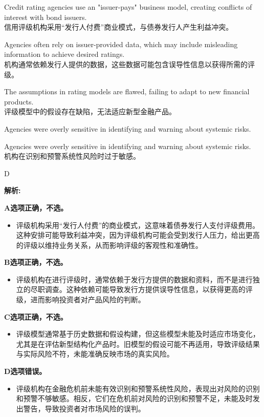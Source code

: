 \documentclass{article}
\newenvironment{explanation}
{\textbf{解析:}\par}
{\par}
\begin{document}
\begin{choices}
    \item Credit rating agencies use an "issuer-pays" business model, creating conflicts of interest with bond issuers.\\
    信用评级机构采用“发行人付费”商业模式，与债券发行人产生利益冲突。
    \item Agencies often rely on issuer-provided data, which may include misleading information to achieve desired ratings.\\
    机构通常依赖发行人提供的数据，这些数据可能包含误导性信息以获得所需的评级。
    \item The assumptions in rating models are flawed, failing to adapt to new financial products.\\
    评级模型中的假设存在缺陷，无法适应新型金融产品。
    \item Agencies were overly sensitive in identifying and warning about systemic risks.
    \item Agencies were overly sensitive in identifying and warning about systemic risks.\\
    机构在识别和预警系统性风险时过于敏感。
\end{choices}

\begin{correctanswer}
    D
\end{correctanswer}

\begin{explanation}
    \textbf{A选项正确，不选。}
    \begin{itemize}
        \item 评级机构采用“发行人付费”的商业模式，这意味着债券发行人支付评级费用。这种安排可能导致利益冲突，因为评级机构可能会受到发行人压力，给出更高的评级以维持业务关系，从而影响评级的客观性和准确性。
    \end{itemize}

    \textbf{B选项正确，不选。}
    \begin{itemize}
        \item 评级机构在进行评级时，通常依赖于发行方提供的数据和资料，而不是进行独立的尽职调查。这种依赖可能导致发行方提供误导性信息，以获得更高的评级，进而影响投资者对产品风险的判断。
    \end{itemize}

    \textbf{C选项正确，不选。}
    \begin{itemize}
        \item 评级模型通常基于历史数据和假设构建，但这些模型未能及时适应市场变化，尤其是在评估新型结构化产品时。旧模型的假设可能不再适用，导致评级结果与实际风险不符，未能准确反映市场的真实风险。
    \end{itemize}

    \textbf{D选项错误。}
    \begin{itemize}
        \item 评级机构在金融危机前未能有效识别和预警系统性风险，表现出对风险的识别和预警不够敏感。相反，它们在危机前对风险的识别和预警不足，未能及时发出警告，导致投资者对市场风险的误判。
    \end{itemize}
\end{explanation}
\end{document}
